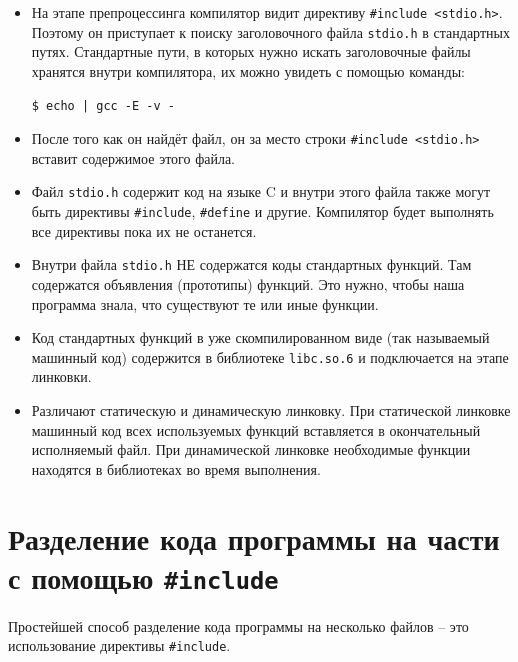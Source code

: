 \documentclass{article}
\begin{document}
\begin{itemize}
\item На этапе препроцессинга компилятор видит директиву \texttt{\#include <stdio.h>}. Поэтому он приступает к поиску заголовочного файла \texttt{stdio.h} в стандартных путях. Стандартные пути, в которых нужно искать заголовочные файлы хранятся внутри компилятора, их можно увидеть с помощью команды:
\begin{lstlisting}[style=csMiptBash]
$ echo | gcc -E -v -
\end{lstlisting}
\item После того как он найдёт файл, он за место строки \texttt{\#include <stdio.h>} вставит содержимое этого файла. 

\item Файл \texttt{stdio.h} содержит код на языке C и внутри этого файла также могут быть директивы \texttt{\#include}, \texttt{\#define} и другие. Компилятор будет выполнять все директивы пока их не останется.

\item Внутри файла \texttt{stdio.h} НЕ содержатся коды стандартных функций. Там содержатся объявления (прототипы) функций. Это нужно, чтобы наша программа знала, что существуют те или иные функции.

\item Код стандартных функций в уже скомпилированном виде (так называемый машинный код) содержится в библиотеке \texttt{libc.so.6} и подключается на этапе линковки.

\item Различают статическую и динамическую линковку. При статической линковке машинный код всех используемых функций вставляется в окончательный исполняемый файл. При динамической линковке необходимые функции находятся в библиотеках во время выполнения.

\end{itemize}


\newpage
\section{Разделение кода программы на части с помощью \texttt{\#include}}
Простейшей способ разделение кода программы на несколько файлов -- это использование директивы \texttt{\#include}.
\end{document}
